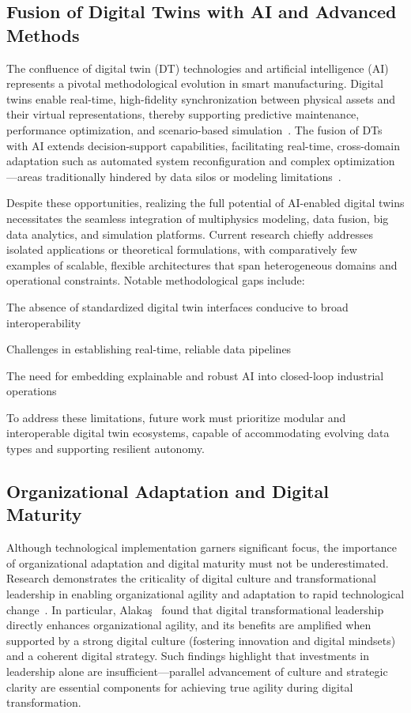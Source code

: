 \documentclass[sigconf]{acmart}
\begin{document}
\subsection{Fusion of Digital Twins with AI and Advanced Methods}

The confluence of digital twin (DT) technologies and artificial intelligence (AI) represents a pivotal methodological evolution in smart manufacturing. Digital twins enable real-time, high-fidelity synchronization between physical assets and their virtual representations, thereby supporting predictive maintenance, performance optimization, and scenario-based simulation~\cite{ref91}. The fusion of DTs with AI extends decision-support capabilities, facilitating real-time, cross-domain adaptation such as automated system reconfiguration and complex optimization—areas traditionally hindered by data silos or modeling limitations~\cite{ref95}.

Despite these opportunities, realizing the full potential of AI-enabled digital twins necessitates the seamless integration of multiphysics modeling, data fusion, big data analytics, and simulation platforms. Current research chiefly addresses isolated applications or theoretical formulations, with comparatively few examples of scalable, flexible architectures that span heterogeneous domains and operational constraints. Notable methodological gaps include:

The absence of standardized digital twin interfaces conducive to broad interoperability

Challenges in establishing real-time, reliable data pipelines

The need for embedding explainable and robust AI into closed-loop industrial operations

To address these limitations, future work must prioritize modular and interoperable digital twin ecosystems, capable of accommodating evolving data types and supporting resilient autonomy.

\subsection{Organizational Adaptation and Digital Maturity}

Although technological implementation garners significant focus, the importance of organizational adaptation and digital maturity must not be underestimated. Research demonstrates the criticality of digital culture and transformational leadership in enabling organizational agility and adaptation to rapid technological change~\cite{ref93}. In particular, Alakaş~\cite{ref93} found that digital transformational leadership directly enhances organizational agility, and its benefits are amplified when supported by a strong digital culture (fostering innovation and digital mindsets) and a coherent digital strategy. Such findings highlight that investments in leadership alone are insufficient—parallel advancement of culture and strategic clarity are essential components for achieving true agility during digital transformation.
\end{document}
